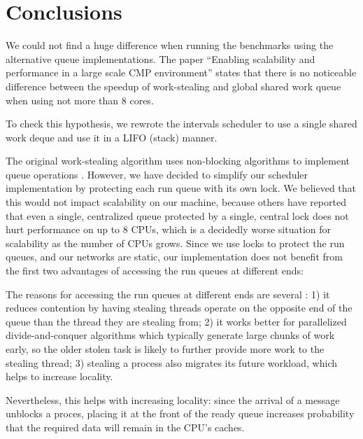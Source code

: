 
\chapter{Conclusions}
\label{chap:queues-conclusions}


We could not find a huge difference when running the benchmarks using
the alternative queue implementations. The paper ``Enabling
scalability and performance in a large scale CMP environment''
\cite{Saha2007} states that there is no noticeable difference between
the speedup of work-stealing and global shared work queue when using
not more than 8 cores.

To check this hypothesis, we rewrote the intervals scheduler to use a
single shared work deque and use it in a LIFO (stack) manner.


The original work-stealing algorithm uses non-blocking algorithms to
implement queue operations \cite{Arora2001}. However, we have decided
to simplify our scheduler implementation by protecting each run queue
with its own lock. We believed that this would not impact scalability
on our machine, because others \cite{Saha2007} have reported that even
a single, centralized queue protected by a single, central lock does
not hurt performance on up to 8 CPUs, which is a decidedly worse
situation for scalability as the number of CPUs grows. Since we use
locks to protect the run queues, and our networks are static, our
implementation does not benefit from the first two advantages of
accessing the run queues at different ends:

The reasons for accessing the run queues at different ends are several
\cite{Frigo1998}: 1) it reduces contention by having stealing threads
operate on the opposite end of the queue than the thread they are
stealing from; 2) it works better for parallelized divide-and-conquer
algorithms which typically generate large chunks of work early, so the
older stolen task is likely to further provide more work to the
stealing thread; 3) stealing a process also migrates its future
workload, which helps to increase locality.

Nevertheless, this helps with increasing locality: since the arrival
of a message unblocks a proces, placing it at the front of the ready
queue increases probability that the required data will remain in the
CPU’s caches.

